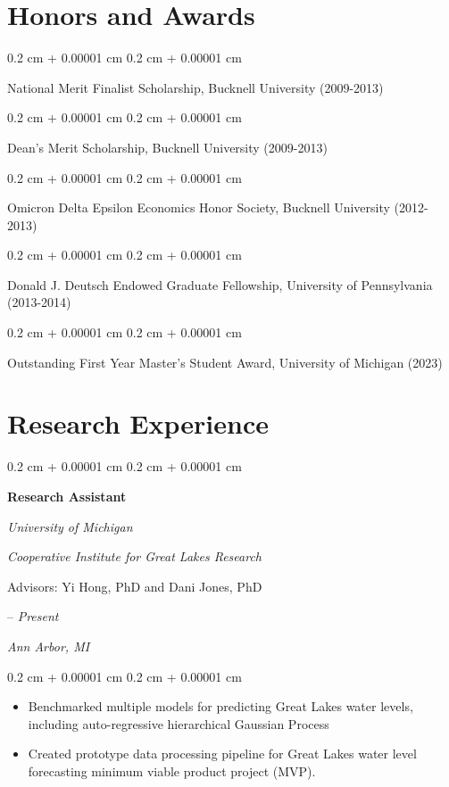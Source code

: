 \documentclass[11pt, letterpaper]{article}
\newenvironment{highlights}{
    \begin{itemize}[
        topsep=0.10 cm,
        parsep=0.10 cm,
        partopsep=0pt,
        itemsep=0pt,
        leftmargin=0.4 cm + 10pt
    ]
}{
    \end{itemize}
} %
\newenvironment{onecolentry}{
    \begin{adjustwidth}{
        0.2 cm + 0.00001 cm
    }{
        0.2 cm + 0.00001 cm
    }
}{
    \end{adjustwidth}
} %
\newenvironment{twocolentry}[2][]{
    \onecolentry
    \def\secondColumn{#2}
    \setcolumnwidth{\fill, 4.5 cm}
    \begin{paracol}{2}
}{
    \switchcolumn \raggedleft \secondColumn
    \end{paracol}
    \endonecolentry
} %
\begin{document}
\section{Honors and Awards}

\begin{onecolentry}
    National Merit Finalist Scholarship, Bucknell University (2009-2013)
\end{onecolentry}
\begin{onecolentry}
    Dean's Merit Scholarship, Bucknell University (2009-2013)
\end{onecolentry}
\begin{onecolentry}
    Omicron Delta Epsilon Economics Honor Society, Bucknell University (2012-2013)
\end{onecolentry}
\begin{onecolentry}
    Donald J. Deutsch Endowed Graduate Fellowship, University of Pennsylvania (2013-2014)
\end{onecolentry}
\begin{onecolentry}
    Outstanding First Year Master's Student Award, University of Michigan (2023)
\end{onecolentry}


\section{Research Experience}

\begin{twocolentry}{2023 – \textit{Present}

        \textit{Ann Arbor, MI}
    }

    \textbf{Research Assistant}

    \textit{University of Michigan}

    \textit{Cooperative Institute for Great Lakes Research}

    Advisors: Yi Hong, PhD and Dani Jones, PhD
\end{twocolentry}

\vspace{0.05 cm}
\begin{onecolentry}
    \begin{highlights}
        \item Benchmarked multiple models for predicting Great Lakes water levels, including auto-regressive hierarchical Gaussian Process
        \item Created prototype data processing pipeline for Great Lakes water level forecasting minimum viable product project (MVP).
    \end{highlights}
\end{onecolentry}
\end{document}
